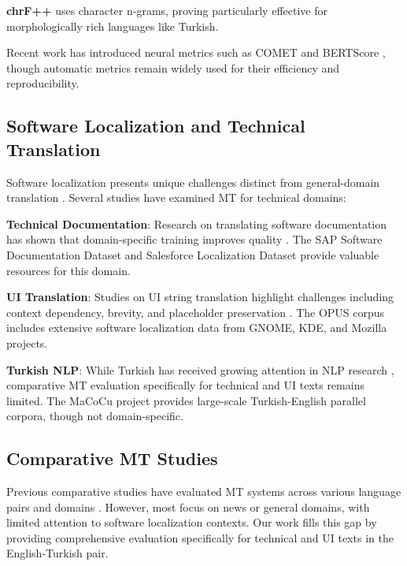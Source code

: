 \textbf{chrF++} \cite{popovic2017chrf} uses character n-grams, proving particularly effective for morphologically rich languages like Turkish.

Recent work has introduced neural metrics such as COMET \cite{rei2020comet} and BERTScore \cite{zhang2019bertscore}, though automatic metrics remain widely used for their efficiency and reproducibility.

\subsection{Software Localization and Technical Translation}

Software localization presents unique challenges distinct from general-domain translation \cite{esselink2000practical}. Several studies have examined MT for technical domains:

\textbf{Technical Documentation}: Research on translating software documentation has shown that domain-specific training improves quality \cite{sap2020dataset}. The SAP Software Documentation Dataset \cite{sap2020dataset} and Salesforce Localization Dataset \cite{salesforce2019localization} provide valuable resources for this domain.

\textbf{UI Translation}: Studies on UI string translation highlight challenges including context dependency, brevity, and placeholder preservation \cite{mozilla2018localization}. The OPUS corpus \cite{tiedemann2012parallel} includes extensive software localization data from GNOME, KDE, and Mozilla projects.

\textbf{Turkish NLP}: While Turkish has received growing attention in NLP research \cite{turkish2020nlp}, comparative MT evaluation specifically for technical and UI texts remains limited. The MaCoCu project \cite{macocu2021} provides large-scale Turkish-English parallel corpora, though not domain-specific.

\subsection{Comparative MT Studies}

Previous comparative studies have evaluated MT systems across various language pairs and domains \cite{wmt2020findings, wmt2021findings}. However, most focus on news or general domains, with limited attention to software localization contexts. Our work fills this gap by providing comprehensive evaluation specifically for technical and UI texts in the English-Turkish pair.
